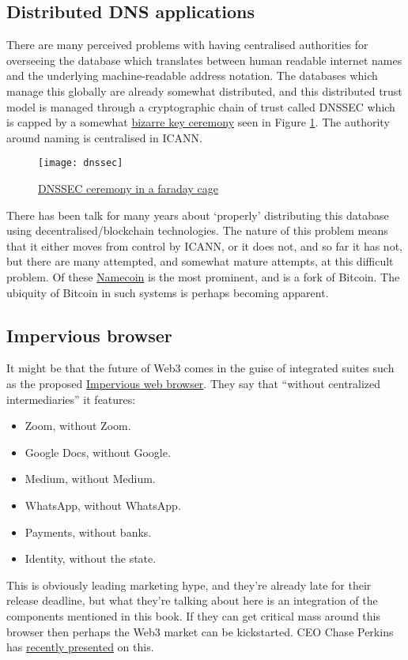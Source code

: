 \subsection{Distributed DNS applications} 
There are many perceived problems with having centralised authorities for overseeing the database which translates between human readable internet names and the underlying machine-readable address notation. The databases which manage this globally are already somewhat distributed, and this distributed trust model is managed through a cryptographic chain of trust called DNSSEC which is capped by a somewhat \href{https://www.iana.org/dnssec/ceremonies}{bizarre key ceremony} seen in Figure \ref{fig:dnssec}. The authority around naming is centralised in ICANN. 
\begin{figure}
  \centering
    \texttt{[image: dnssec]}
  \caption{\href{https://www.internetsociety.org/blog/2016/10/watch-live-today-dnssec-root-ksk-ceremony-at-1700-utc/}{DNSSEC ceremony in a faraday cage}}
  \label{fig:dnssec}
\end{figure}
There has been talk for many years about `properly' distributing this database using decentralised/blockchain technologies\cite{karaarslan2018blockchain}. The nature of this problem means that it either moves from control by ICANN, or it does not, and so far it has not, but there are many attempted, and somewhat mature attempts, at this difficult problem. Of these \href{https://www.namecoin.org/}{Namecoin} is the most prominent, and is a fork of Bitcoin. The ubiquity of Bitcoin in such systems is perhaps becoming apparent.
\subsection{Impervious browser}
It might be that the future of Web3 comes in the guise of integrated suites such as the proposed \href{https://newsletter.impervious.ai/impervious-browser-functionality-overview/}{Impervious web browser}. They say that ``without centralized intermediaries'' it features:
\begin{itemize}
\item    Zoom, without Zoom.
\item    Google Docs, without Google.
\item    Medium, without Medium.
\item    WhatsApp, without WhatsApp.
\item    Payments, without banks.
\item    Identity, without the state.
\end{itemize}
This is obviously leading marketing hype, and they're already late for their release deadline, but what they're talking about here is an integration of the components mentioned in this book. If they can get critical mass around this browser then perhaps the Web3 market can be kickstarted. CEO Chase Perkins has \href{https://www.youtube.com/watch?v=2J8v-TMygK8}{recently presented} on this.
